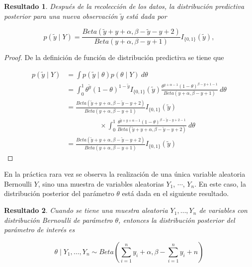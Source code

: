 \documentclass[
  10pt,
  spanish,
]{book}
\newtheorem{proposition}{Resultado}[chapter]
\theoremstyle{definition}
\theoremstyle{definition}
\theoremstyle{definition}
\theoremstyle{definition}
\theoremstyle{remark}
\begin{document}
\begin{proposition}
\protect\hypertarget{prp:unnamed-chunk-5}{}{\label{prp:unnamed-chunk-5} }Después de la recolección de los datos, la distribución predictiva posterior para una nueva observación \(\tilde{y}\) está dada por

\begin{equation}
p(\tilde{y} \mid Y)=
  \frac{Beta(\tilde{y}+y+\alpha,\beta-\tilde{y}-y+2)}{Beta(y+\alpha,\beta-y+1)}I_{\{0,1\}}(\tilde{y}),
\end{equation}
\end{proposition}

\begin{proof}
{}De la definición de función de distribución predictiva se tiene que

\begin{align*}
p(\tilde{y} \mid Y)&=\int p(\tilde{y} \mid \theta)p(\theta \mid Y)\ d\theta\\
&=\int_0^1\theta^{\tilde{y}}(1-\theta)^{1-\tilde{y}}I_{\{0,1\}}(\tilde{y})\frac{\theta^{y+\alpha-1}(1-\theta)^{\beta-y+1-1}}{Beta(y+\alpha,\beta-y+1)}\ d\theta\\
&=\frac{Beta(\tilde{y}+y+\alpha,\beta-\tilde{y}-y+2)}{Beta(y+\alpha,\beta-y+1)}I_{\{0,1\}}(\tilde{y})\\
&\hspace{2cm}\times \int_0^1\frac{\theta^{\tilde{y}+y+\alpha-1}(1-\theta)^{\beta-\tilde{y}-y+2-1}}{Beta(\tilde{y}+y+\alpha,\beta-\tilde{y}-y+2)}\ d\theta\\
&=\frac{Beta(\tilde{y}+y+\alpha,\beta-\tilde{y}-y+2)}{Beta(y+\alpha,\beta-y+1)}I_{\{0,1\}}(\tilde{y})
\end{align*}
\end{proof}

En la práctica rara vez se observa la realización de una única variable
aleatoria Bernoulli \(Y\), sino una muestra de variables aleatorias \(Y_1\),
\(\cdots\), \(Y_n\). En este caso, la distribución posterior del parámetro
\(\theta\) está dada en el siguiente resultado.

\begin{proposition}
\protect\hypertarget{prp:unnamed-chunk-7}{}{\label{prp:unnamed-chunk-7} }Cuando se tiene una muestra aleatoria \(Y_1,\ldots,Y_n\) de variables con distribución Bernoulli de parámetro \(\theta\), entonces la distribución posterior del parámetro de interés es

\begin{equation*}
\theta \mid Y_1,\ldots,Y_n \sim Beta\left(\sum_{i=1}^ny_i+\alpha,\beta-\sum_{i=1}^ny_i+n\right)
\end{equation*}
\end{proposition}
\end{document}
